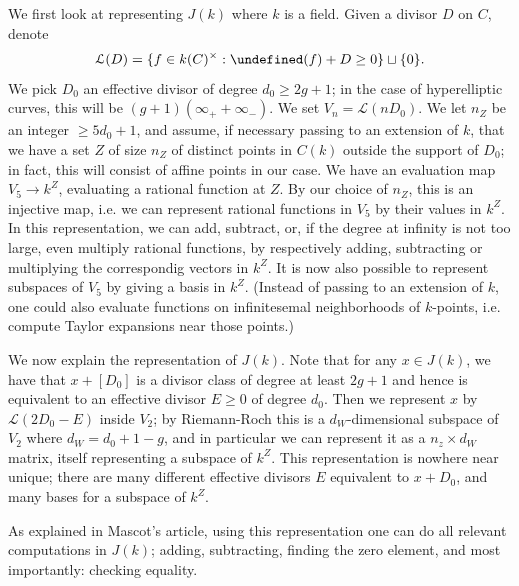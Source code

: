 \documentclass[12pt]{article}
\newcommand{\Lcal}{\mathcal{L}}
\let\div\undefined
\DeclareMathOperator{\div}{div}
\theoremstyle{plain}
\theoremstyle{definition}
\theoremstyle{remark}
\begin{document}
We first look at representing $J(k)$ where $k$ is a field. Given a divisor $D$ on $C$, denote
\[
\Lcal(D) = \{f \in k(C)^\times : \div(f) + D \geq 0 \} \sqcup \{0\}.
\]
We pick $D_0$ an effective divisor of degree $d_0 \geq 2g+1$; in the case of hyperelliptic curves, this will be $(g+1)(\infty_+ + \infty_-)$. We set $V_n = \Lcal(nD_0)$. We let $n_Z$ be an integer $\geq 5d_0 + 1$, and assume, if necessary passing to an extension of $k$, that we have a set $Z$ of size $n_Z$ of distinct points in $C(k)$ outside the support of $D_0$; in fact, this will consist of affine points in our case. We have an evaluation map $V_5 \to k^Z$, evaluating a rational function at $Z$. By our choice of $n_Z$, this is an injective map, i.e. we can represent rational functions in $V_5$ by their values in $k^Z$. In this representation, we can add, subtract, or, if the degree at infinity is not too large, even multiply rational functions, by respectively adding, subtracting or multiplying the correspondig vectors in $k^Z$. It is now also possible to represent subspaces of $V_5$ by giving a basis in $k^Z$. (Instead of passing to an extension of $k$, one could also evaluate functions on infinitesemal neighborhoods of $k$-points, i.e. compute Taylor expansions near those points.)

We now explain the representation of $J(k)$. Note that for any $x \in J(k)$, we have that $x + [D_0]$ is a divisor class of degree at least $2g+1$ and hence is equivalent to an effective divisor $E \geq 0$ of degree $d_0$. Then we represent $x$ by $\Lcal(2D_0 - E)$ inside $V_2$; by Riemann-Roch this is a $d_W$-dimensional subspace of $V_2$ where $d_W = d_0 + 1 - g$, and in particular we can represent it as a $n_z \times d_W$ matrix, itself representing a subspace of $k^Z$. This representation is nowhere near unique; there are many different effective divisors $E$ equivalent to $x + D_0$, and many bases for a subspace of $k^Z$.

As explained in Mascot's article, using this representation one can do all relevant computations in $J(k)$; adding, subtracting, finding the zero element, and most importantly: checking equality.
\end{document}
